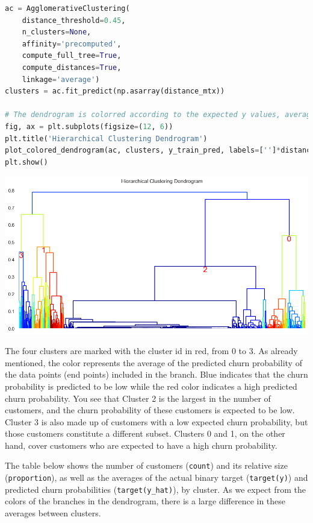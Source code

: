 \documentclass{article}
\begin{document}
\begin{lstlisting}[language=Python]
ac = AgglomerativeClustering(
    distance_threshold=0.45, 
    n_clusters=None, 
    affinity='precomputed',
    compute_full_tree=True, 
    compute_distances=True, 
    linkage='average')
clusters = ac.fit_predict(np.asarray(distance_mtx))

# The dendrogram is colorred according to the expected y values, averaged at each node.
fig, ax = plt.subplots(figsize=(12, 6)) 
plt.title('Hierarchical Clustering Dendrogram')
plot_colored_dendrogram(ac, clusters, y_train_pred, labels=['']*distance_mtx.shape[0])
plt.show()
\end{lstlisting}

\includegraphics[width=1\textwidth]{dendrogram_depth3_colored_thres060}

The four clusters are marked with the cluster id in red, from 0 to 3. As already mentioned, the color represents the average of the predicted churn probability of the data points (end points) included in the branch. Blue indicates that the churn probability is predicted to be low while the red color indicates a high predicted churn probability. You see that Cluster 2 is the largest in the number of customers, and the churn probability of these customers is expected to be low. Cluster 3 is also made up of customers with a low expected churn probability, but those customers constitute a different subset. Clusters 0 and 1, on the other hand, cover customers who are expected to have a high churn probability. 

The table below shows the number of customers (\verb|count|) and its relative size (\verb|proportion|), as well as the averages of the actual binary target (\verb|target(y)|) and predicted churn probabilities (\verb|target(y_hat)|), by cluster. As we expect from the colors of the branches in the dendrogram, there is a large difference in these averages between clusters.
\end{document}
